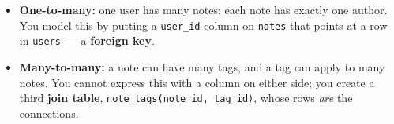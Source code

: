 \begin{itemize}
\tightlist
\item
  \textbf{One-to-many:} one user has many notes; each note has exactly one author. You model this by putting a \texttt{user\_id} column on \texttt{notes} that points at a row in \texttt{users}~--- a \textbf{foreign key}.
\item
  \textbf{Many-to-many:} a note can have many tags, and a tag can apply to many notes. You cannot express this with a column on either side; you create a third \textbf{join table}, \texttt{note\_}\allowbreak{}\texttt{tags(note\_}\allowbreak{}\texttt{id,}\allowbreak{}\texttt{\ tag\_}\allowbreak{}\texttt{id)}, whose rows \emph{are} the connections.
\end{itemize}

\begin{codebox}

\begin{Shaded}
\begin{Highlighting}[]
 
          
  
\NormalTok{);}
 
               
   \NormalTok{),   }
 \NormalTok{,}
  
\NormalTok{);}
 
         
  
\NormalTok{);}
 
   \NormalTok{),}
   \NormalTok{),}
     
\NormalTok{);}
\end{Highlighting}
\end{Shaded}

\end{codebox}

